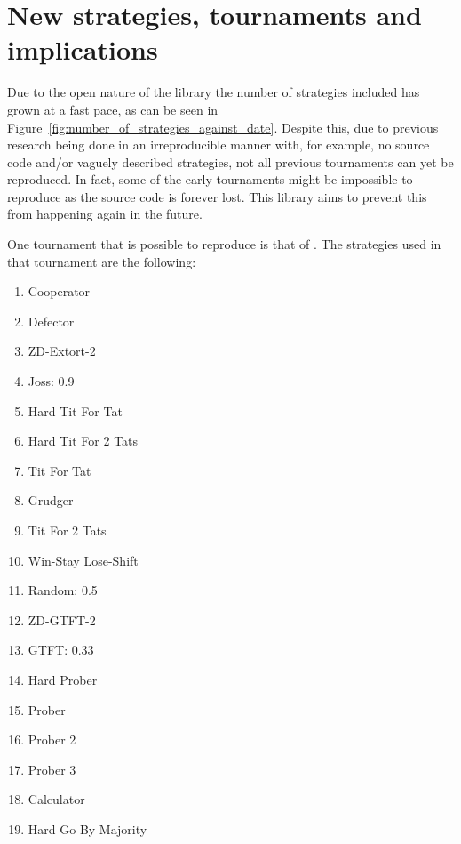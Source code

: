 \documentclass{jors}
\begin{document}
\section*{New strategies, tournaments and implications}\label{sec:new-strategies-and-implications}

Due to the open nature of the library the number of strategies included has
grown at a fast pace, as can be seen in
Figure~\ref{fig:number_of_strategies_against_date}. Despite this, due to
previous research being done in an irreproducible manner with, for example, no
source code and/or vaguely described strategies, not all previous tournaments
can yet be reproduced. In fact, some of the early tournaments might be
impossible to reproduce as the source code is forever lost. This library aims
to prevent this from happening again in the future.

One tournament that is possible to reproduce is that of
\cite{Stewart2012}. The strategies used in that tournament are the following:

\begin{multicols}{2}
    \begin{enumerate}[noitemsep,topsep=0pt]
        \item Cooperator
        \item Defector
        \item ZD-Extort-2
        \item Joss: 0.9
        \item Hard Tit For Tat
        \item Hard Tit For 2 Tats
        \item Tit For Tat
        \item Grudger
        \item Tit For 2 Tats
        \item Win-Stay Lose-Shift
        \item Random: 0.5
        \item ZD-GTFT-2
        \item GTFT: 0.33
        \item Hard Prober
        \item Prober
        \item Prober 2
        \item Prober 3
        \item Calculator
        \item Hard Go By Majority
    \end{enumerate}
\end{multicols}
\end{document}
